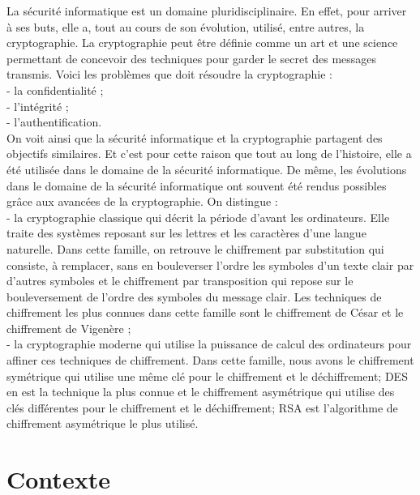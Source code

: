 La sécurité informatique est un domaine pluridisciplinaire. En effet, pour arriver à ses buts, elle a, tout au cours de son évolution, utilisé, entre autres, la cryptographie. La cryptographie peut être définie comme un art et une science permettant de concevoir des techniques pour garder le secret des messages transmis. Voici les problèmes que doit résoudre la cryptographie : \\
-	la confidentialité ; \\
-	l’intégrité ; \\
-	l’authentification. \\
On voit ainsi que la sécurité informatique et la cryptographie partagent des objectifs similaires. Et c’est pour cette raison que tout au long de l’histoire, elle a été utilisée dans le domaine de la sécurité informatique. De même, les évolutions dans le domaine de la sécurité informatique ont souvent été rendus possibles grâce aux avancées de la cryptographie.
On distingue :\\
-	la cryptographie classique qui décrit la période d’avant les ordinateurs. Elle traite des systèmes reposant sur les lettres et les caractères d’une langue naturelle. Dans cette famille, on retrouve le chiffrement par substitution qui consiste, à remplacer, sans en bouleverser l’ordre les symboles d’un texte clair par d’autres symboles et le chiffrement par transposition qui repose sur le bouleversement de l’ordre des symboles du message clair. Les techniques de chiffrement les plus connues dans cette famille sont le chiffrement de César et le chiffrement de Vigenère ; \\
-	 la cryptographie moderne qui utilise la puissance de calcul des ordinateurs pour affiner ces techniques de chiffrement. Dans cette famille, nous avons le chiffrement symétrique qui utilise une même clé pour le chiffrement et le déchiffrement; DES en est la technique la plus connue et le chiffrement asymétrique qui utilise des clés différentes pour le chiffrement et le déchiffrement; RSA est l’algorithme de chiffrement asymétrique le plus utilisé.\\

\section{Contexte}

